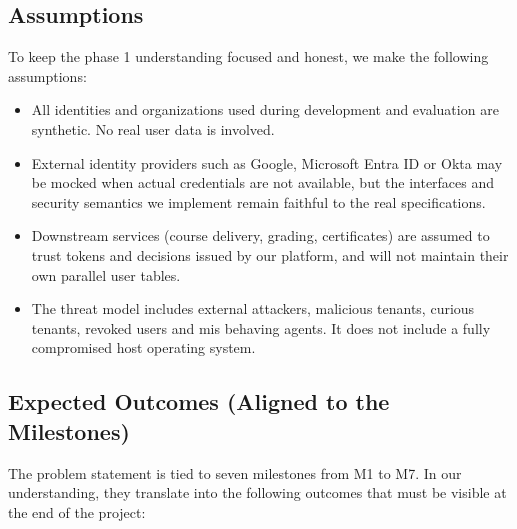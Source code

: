 \documentclass[11pt,a4paper]{article}
\begin{document}
\subsection{Assumptions}

To keep the phase 1 understanding focused and honest, we make the following assumptions:

\begin{itemize}[leftmargin=1.5em,itemsep=2pt]
    \item All identities and organizations used during development and evaluation are synthetic. No real user data is involved.
    \item External identity providers such as Google, Microsoft Entra ID or Okta may be mocked when actual credentials are not available, but the interfaces and security semantics we implement remain faithful to the real specifications.
    \item Downstream services (course delivery, grading, certificates) are assumed to trust tokens and decisions issued by our platform, and will not maintain their own parallel user tables.
    \item The threat model includes external attackers, malicious tenants, curious tenants, revoked users and mis behaving agents. It does not include a fully compromised host operating system.
\end{itemize}

\subsection{Expected Outcomes (Aligned to the Milestones)}

The problem statement is tied to seven milestones from M1 to M7. In our understanding, they translate into the following outcomes that must be visible at the end of the project:
\end{document}
